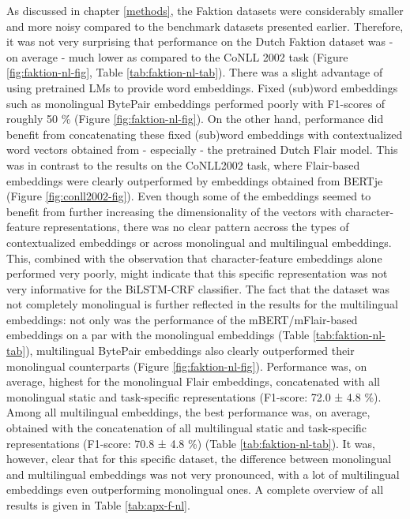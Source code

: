 \documentclass[12pt,a4paper,]{book}
\begin{document}
As discussed in chapter \ref{methods}, the Faktion datasets were considerably smaller and more noisy compared to the benchmark datasets presented earlier. Therefore, it was not very surprising that performance on the Dutch Faktion dataset was - on average - much lower as compared to the CoNLL 2002 task (Figure \ref{fig:faktion-nl-fig}, Table \ref{tab:faktion-nl-tab}). There was a slight advantage of using pretrained LMs to provide word embeddings. Fixed (sub)word embeddings such as monolingual BytePair embeddings performed poorly with F1-scores of roughly 50 \% (Figure \ref{fig:faktion-nl-fig}). On the other hand, performance did benefit from concatenating these fixed (sub)word embeddings with contextualized word vectors obtained from - especially - the pretrained Dutch Flair model. This was in contrast to the results on the CoNLL2002 task, where Flair-based embeddings were clearly outperformed by embeddings obtained from BERTje (Figure \ref{fig:conll2002-fig}). Even though some of the embeddings seemed to benefit from further increasing the dimensionality of the vectors with character-feature representations, there was no clear pattern accross the types of contextualized embeddings or across monolingual and multilingual embeddings. This, combined with the observation that character-feature embeddings alone performed very poorly, might indicate that this specific representation was not very informative for the BiLSTM-CRF classifier. The fact that the dataset was not completely monolingual is further reflected in the results for the multilingual embeddings: not only was the performance of the mBERT/mFlair-based embeddings on a par with the monolingual embeddings (Table \ref{tab:faktion-nl-tab}), multilingual BytePair embeddings also clearly outperformed their monolingual counterparts (Figure \ref{fig:faktion-nl-fig}). Performance was, on average, highest for the monolingual Flair embeddings, concatenated with all monolingual static and task-specific representations (F1-score: 72.0 ± 4.8 \%). Among all multilingual embeddings, the best performance was, on average, obtained with the concatenation of all multilingual static and task-specific representations (F1-score: 70.8 ± 4.8 \%) (Table \ref{tab:faktion-nl-tab}). It was, however, clear that for this specific dataset, the difference between monolingual and multilingual embeddings was not very pronounced, with a lot of multilingual embeddings even outperforming monolingual ones. A complete overview of all results is given in Table \ref{tab:apx-f-nl}.
\end{document}
